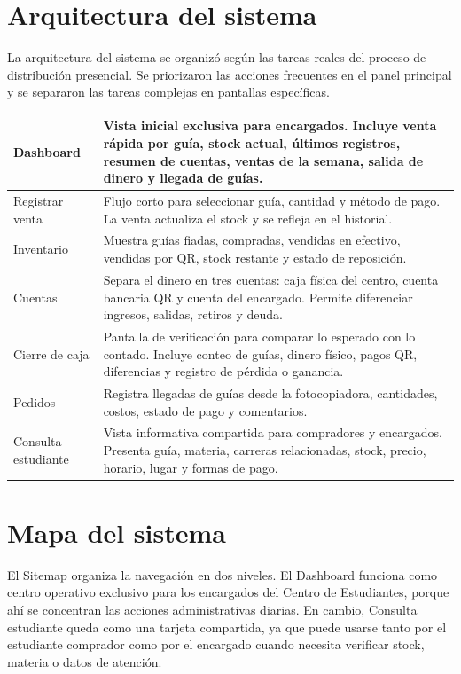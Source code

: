 ﻿\documentclass[12pt,letterpaper]{article}
\begin{document}
\section{Arquitectura del sistema}

La arquitectura del sistema se organizó según las tareas reales del proceso de distribución presencial. Se priorizaron las acciones frecuentes en el panel principal y se separaron las tareas complejas en pantallas específicas.

\begin{center}
\begin{tabularx}{\textwidth}{|B{4cm}|Y|}
\hline
Dashboard & Vista inicial exclusiva para encargados. Incluye venta rápida por guía, stock actual, últimos registros, resumen de cuentas, ventas de la semana, salida de dinero y llegada de guías. \\
\hline
Registrar venta & Flujo corto para seleccionar guía, cantidad y método de pago. La venta actualiza el stock y se refleja en el historial. \\
\hline
Inventario & Muestra guías fiadas, compradas, vendidas en efectivo, vendidas por QR, stock restante y estado de reposición. \\
\hline
Cuentas & Separa el dinero en tres cuentas: caja física del centro, cuenta bancaria QR y cuenta del encargado. Permite diferenciar ingresos, salidas, retiros y deuda. \\
\hline
Cierre de caja & Pantalla de verificación para comparar lo esperado con lo contado. Incluye conteo de guías, dinero físico, pagos QR, diferencias y registro de pérdida o ganancia. \\
\hline
Pedidos & Registra llegadas de guías desde la fotocopiadora, cantidades, costos, estado de pago y comentarios. \\
\hline
Consulta estudiante & Vista informativa compartida para compradores y encargados. Presenta guía, materia, carreras relacionadas, stock, precio, horario, lugar y formas de pago. \\
\hline
\end{tabularx}
\end{center}

\section{Mapa del sistema}

El Sitemap organiza la navegación en dos niveles. El Dashboard funciona como centro operativo exclusivo para los encargados del Centro de Estudiantes, porque ahí se concentran las acciones administrativas diarias. En cambio, Consulta estudiante queda como una tarjeta compartida, ya que puede usarse tanto por el estudiante comprador como por el encargado cuando necesita verificar stock, materia o datos de atención.
\end{document}
